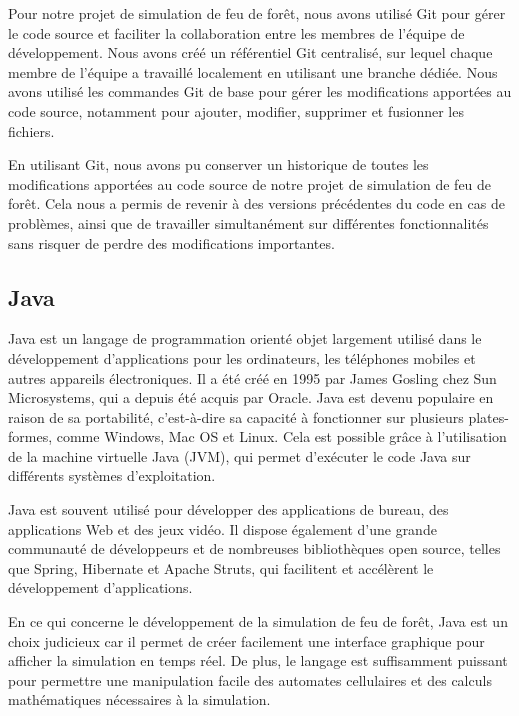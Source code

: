 Pour notre projet de simulation de feu de forêt, nous avons utilisé Git pour gérer le code source et faciliter la collaboration entre les membres de l'équipe de développement. Nous avons créé un référentiel Git centralisé, sur lequel chaque membre de l'équipe a travaillé localement en utilisant une branche dédiée. Nous avons utilisé les commandes Git de base pour gérer les modifications apportées au code source, notamment pour ajouter, modifier, supprimer et fusionner les fichiers.

En utilisant Git, nous avons pu conserver un historique de toutes les modifications apportées au code source de notre projet de simulation de feu de forêt. Cela nous a permis de revenir à des versions précédentes du code en cas de problèmes, ainsi que de travailler simultanément sur différentes fonctionnalités sans risquer de perdre des modifications importantes.

\subsection{Java}

Java est un langage de programmation orienté objet largement utilisé dans le développement d'applications pour les ordinateurs, les téléphones mobiles et autres appareils électroniques. Il a été créé en 1995 par James Gosling chez Sun Microsystems, qui a depuis été acquis par Oracle. Java est devenu populaire en raison de sa portabilité, c'est-à-dire sa capacité à fonctionner sur plusieurs plates-formes, comme Windows, Mac OS et Linux. Cela est possible grâce à l'utilisation de la machine virtuelle Java (JVM), qui permet d'exécuter le code Java sur différents systèmes d'exploitation.

Java est souvent utilisé pour développer des applications de bureau, des applications Web et des jeux vidéo. Il dispose également d'une grande communauté de développeurs et de nombreuses bibliothèques open source, telles que Spring, Hibernate et Apache Struts, qui facilitent et accélèrent le développement d'applications.

En ce qui concerne le développement de la simulation de feu de forêt, Java est un choix judicieux car il permet de créer facilement une interface graphique pour afficher la simulation en temps réel. De plus, le langage est suffisamment puissant pour permettre une manipulation facile des automates cellulaires et des calculs mathématiques nécessaires à la simulation.